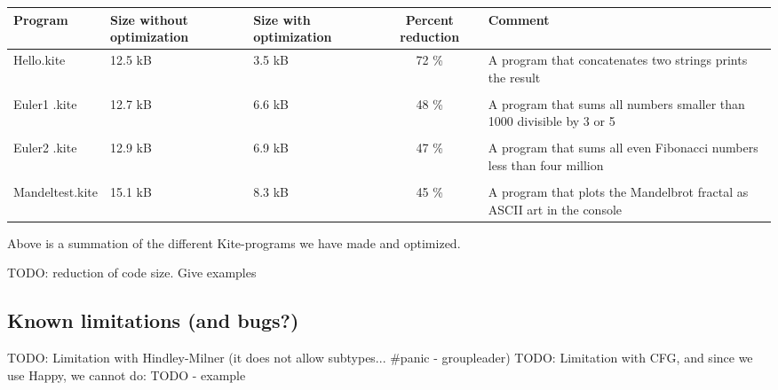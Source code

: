\begin{center}
  \begin{tabulary}{0.9\textwidth}{|L| L |L| C | L | }
    \hline
    Program & Size without optimization & Size with optimization & Percent reduction & Comment \\
    \hline
    Hello.kite       & 12.5 kB & 3.5 kB & 72 \% & A program that concatenates two strings prints the result \\
    & & & & \\
    Euler1 .kite       & 12.7 kB & 6.6 kB & 48 \% & A program that sums all numbers smaller than 1000 divisible by 3 or 5 \\
    & & & & \\
    Euler2 .kite       & 12.9 kB & 6.9 kB & 47 \% & A program that sums all even Fibonacci numbers less than four million \\
    & & & & \\
    Mandeltest.kite       & 15.1 kB & 8.3 kB & 45 \% & A program that plots the Mandelbrot fractal as ASCII art in the console\\
    \hline
  \end{tabulary}  
\end{center}

Above is a summation of the different Kite-programs we have made and optimized.



TODO: reduction of code size. Give examples
\subsection{Known limitations (and bugs?)}
TODO: Limitation with Hindley-Milner (it does not allow subtypes... #panic - groupleader)
TODO: Limitation with CFG, and since we use Happy, we cannot do: TODO - example
